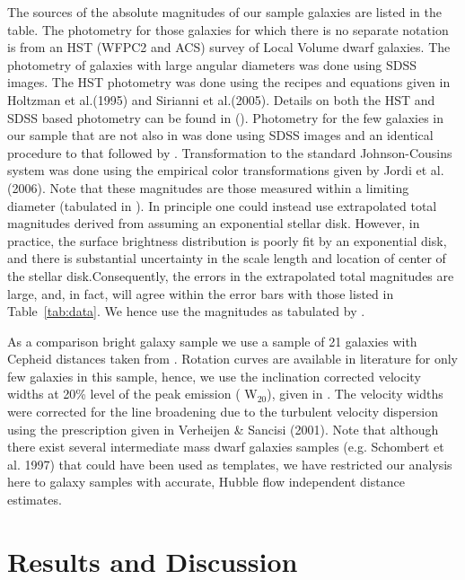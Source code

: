 \documentclass[useAMS,usenatbib]{mn2e}
\begin{document}
The sources of the absolute magnitudes of our sample galaxies are listed in the table. The photometry for those galaxies for which there is no separate notation is from an HST (WFPC2 and ACS) survey of Local Volume dwarf galaxies. The photometry of galaxies with large angular diameters was done using SDSS images.  The HST photometry was done using the recipes and  equations given in  Holtzman et al.(1995) and Sirianni et al.(2005). Details on both the HST and SDSS based photometry can be found in (\cite{sme07}). Photometry for the few galaxies in our sample that are not also in \cite{sme07} was done using SDSS images and an identical procedure to that followed by \cite{sme07}. Transformation to the standard  Johnson-Cousins system was done using the empirical color transformations given by Jordi et al.(2006). Note that these magnitudes are those measured within a limiting diameter (tabulated in \cite{sme07}). In principle one
could instead use extrapolated total magnitudes derived from 
assuming an exponential stellar disk. However, in practice, the surface brightness distribution is poorly fit by an exponential disk, and there is substantial uncertainty in the scale length and location of center of the stellar disk.Consequently, the errors in the extrapolated total magnitudes are large, and, in fact, will agree within the error bars with those listed in Table~\ref{tab:data}. We hence use the magnitudes as tabulated by \cite{sme07}.

 As a comparison bright galaxy sample we use a sample of 21 galaxies with 
Cepheid distances taken from \cite{sakai00}. 
Rotation curves are available  in literature for only few galaxies in this sample, hence,
we use the inclination corrected velocity widths at 20\% level of the peak emission ( W$_{20}$), given in  \cite{sakai00}. The velocity widths were corrected for the line broadening due to the turbulent
velocity dispersion using the prescription  given in Verheijen \& Sancisi (2001).
Note that  although there exist several intermediate mass dwarf galaxies
samples (e.g. Schombert et al. 1997) that could have  been used as
templates, we have restricted our analysis here to galaxy samples with
accurate, Hubble flow independent distance estimates.


\section[]{Results and Discussion}
\label{sec:res}
\end{document}
